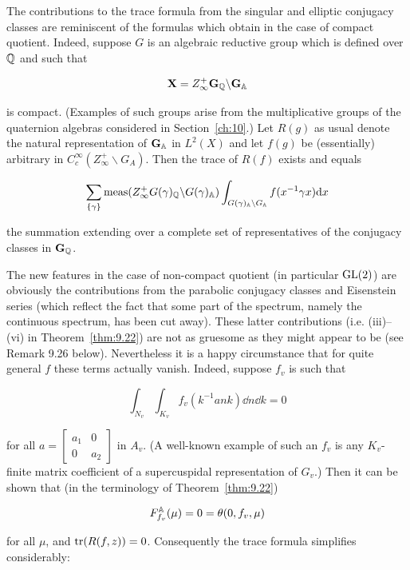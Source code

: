 \begin{remark}\label{rem:9.23}

The contributions to the trace formula from the singular and elliptic conjugacy classes are reminiscent of the formulas which obtain in the case of compact quotient. Indeed, suppose $G$ is an algebraic reductive group which is defined over $\mathbb{Q}$ and such that

\[
\mathbf{X} = Z_\infty^{+}\mathbf{G}_{\mathbb{Q}} \backslash \mathbf{G}_{\mathbb{A}}
\]

is compact. (Examples of such groups arise from the multiplicative groups of the quaternion algebras considered in Section~\ref{ch:10}.) Let $R(g)$ as usual denote the natural representation of $\mathbf{G}_{\mathbb{A}}$ in $L^2(X)$ and let $f(g)$ be (essentially) arbitrary in $C_c^\infty(Z_\infty^{+} \backslash G_A)$. Then the trace of $R(f)$ exists and equals

\[
\sum_{\{\gamma\}}\operatorname{meas}(Z_\infty^{+}G(\gamma)_{\mathbb{Q}} \backslash G(\gamma)_{\mathbb{A}})\int_{G(\gamma)_{\mathbb{A}} \backslash G_{\mathbb{A}}} f(x^{-1}\gamma x)\mathrm{d} x
\]

the summation extending over a complete set of representatives of the conjugacy classes in $\mathbf{G}_{\mathbb{Q}}$.

The new features in the case of non-compact quotient (in particular $\operatorname{GL}(2)$) are obviously the contributions from the parabolic conjugacy classes and Eisenstein series (which reflect the fact that some part of the spectrum, namely the continuous spectrum, has been cut away). These latter contributions (i.e. (iii)--(vi) in Theorem~\ref{thm:9.22}) are not as gruesome as they might appear to be (see Remark 9.26 below). Nevertheless it is a happy circumstance that for quite general $f$ these terms actually vanish. Indeed, suppose $f_v$ is such that

\[
\int_{N_v}\int_{K_v} f_v(k^{-1}ank)\dd n\dd k = 0
\]

for all $a = \begin{bmatrix} a_1 & 0 \\ 0 & a_2 \end{bmatrix}$ in $A_v$. (A well-known example of such an $f_v$ is any $K_v$-finite matrix coefficient of a supercuspidal representation of $G_v$.) Then it can be shown that (in the terminology of Theorem~\ref{thm:9.22})

\[
F_{f_v}^{\mathbb{A}}(\mu) = 0 = \theta(0, f_v, \mu)
\]

for all $\mu$, and $\operatorname{tr}(R(f, z)) = 0$. Consequently the trace formula simplifies considerably:

\end{remark}

